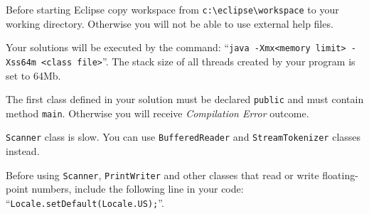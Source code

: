 \ifdefined\online
\else
    Before starting Eclipse copy workspace from \verb|c:\eclipse\workspace| to
    your working directory.
    Otherwise you will not be able to use external help files.
\fi

Your solutions will be executed by the command:
``\verb|java -Xmx<memory limit> -Xss64m <class file>|''.
The stack size of all threads created by your program is set to 64Mb.

The first class defined in your solution must be declared \texttt{public}
and must contain method \verb|main|. Otherwise you will receive
\emph{Compilation Error} outcome.

\verb|Scanner| class is slow. You can use \verb|BufferedReader| and
\verb|StreamTokenizer| classes instead.

Before using \verb|Scanner|, \verb|PrintWriter| and other classes that read
or write floating-point numbers, include the following line in your code:
``\verb|Locale.setDefault(Locale.US);|''.

